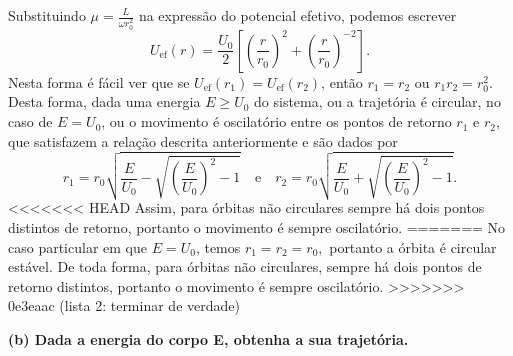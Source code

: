 Substituindo \(\mu = \frac{L}{\omega r_0^2}\) na expressão do potencial efetivo, podemos escrever
\begin{equation}
    U_\mathrm{ef}(r) = \frac{U_0}{2}\left[\left(\frac{r}{r_0}\right)^2 + \left(\frac{r}{r_0}\right)^{-2}\right].
\end{equation}
Nesta forma é fácil ver que se \(U_\mathrm{ef}(r_1) = U_\mathrm{ef}(r_2)\), então \(r_1 = r_2\) ou \(r_1r_2 = r_0^2\). Desta forma, dada uma energia \(E \geq U_0\) do sistema, ou a trajetória é circular, no caso de \(E = U_0\), ou o movimento é oscilatório entre os pontos de retorno \(r_1\) e \(r_2\), que satisfazem a relação descrita anteriormente e são dados por
\begin{equation}
    r_1 = r_0\sqrt{\frac{E}{U_0} - \sqrt{\left(\frac{E}{U_0}\right)^2 - 1}}\quad\text{e}\quad r_2 = r_0\sqrt{\frac{E}{U_0} + \sqrt{\left(\frac{E}{U_0}\right)^2 - 1}}.
\end{equation}
<<<<<<< HEAD
Assim, para órbitas não circulares sempre há dois pontos distintos de retorno, portanto o movimento é sempre oscilatório.
=======
No caso particular em que \(E = U_0\), temos \(r_1 = r_2 = r_0,\) portanto a órbita é circular estável. De toda forma, para órbitas não circulares, sempre há dois pontos de retorno distintos, portanto o movimento é sempre oscilatório.
>>>>>>> 0e3eaac (lista 2: terminar de verdade)

\textbf{(b) Dada a energia do corpo E, obtenha a sua trajetória.}

